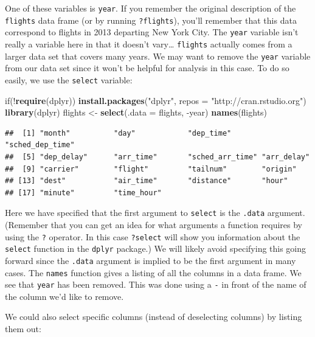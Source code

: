 \documentclass[]{tufte-book}
\newenvironment{Shaded}{\begin{snugshade}}{\end{snugshade}}
\newcommand{\KeywordTok}[1]{\textcolor[rgb]{0.13,0.29,0.53}{\textbf{{#1}}}}
\newcommand{\DataTypeTok}[1]{\textcolor[rgb]{0.13,0.29,0.53}{{#1}}}
\newcommand{\StringTok}[1]{\textcolor[rgb]{0.31,0.60,0.02}{{#1}}}
\newcommand{\NormalTok}[1]{{#1}}
\begin{document}
One of these variables is \texttt{year}. If you remember the original
description of the \texttt{flights} data frame (or by running
\texttt{?flights}), you'll remember that this data correspond to flights
in 2013 departing New York City. The \texttt{year} variable isn't really
a variable here in that it doesn't vary\ldots{} \texttt{flights}
actually comes from a larger data set that covers many years. We may
want to remove the \texttt{year} variable from our data set since it
won't be helpful for analysis in this case. To do so easily, we use the
\texttt{select} variable:

\begin{Shaded}
\begin{Highlighting}[]
\NormalTok{if(!}\KeywordTok{require}\NormalTok{(dplyr))}
  \KeywordTok{install.packages}\NormalTok{(}\StringTok{"dplyr"}\NormalTok{, }\DataTypeTok{repos =} \StringTok{"http://cran.rstudio.org"}\NormalTok{)}
\KeywordTok{library}\NormalTok{(dplyr)}
\NormalTok{flights <-}\StringTok{ }\KeywordTok{select}\NormalTok{(}\DataTypeTok{.data =} \NormalTok{flights, -year)}
\KeywordTok{names}\NormalTok{(flights)}
\end{Highlighting}
\end{Shaded}

\begin{verbatim}
##  [1] "month"          "day"            "dep_time"       "sched_dep_time"
##  [5] "dep_delay"      "arr_time"       "sched_arr_time" "arr_delay"     
##  [9] "carrier"        "flight"         "tailnum"        "origin"        
## [13] "dest"           "air_time"       "distance"       "hour"          
## [17] "minute"         "time_hour"
\end{verbatim}

Here we have specified that the first argument to \texttt{select} is the
\texttt{.data} argument. (Remember that you can get an idea for what
arguments a function requires by using the \texttt{?} operator. In this
case \texttt{?select} will show you information about the
\texttt{select} function in the \texttt{dplyr} package.) We will likely
avoid specifying this going forward since the \texttt{.data} argument is
implied to be the first argument in many cases. The \texttt{names}
function gives a listing of all the columns in a data frame. We see that
\texttt{year} has been removed. This was done using a \texttt{-} in
front of the name of the column we'd like to remove.

We could also select specific columns (instead of deselecting columns)
by listing them out:
\end{document}
